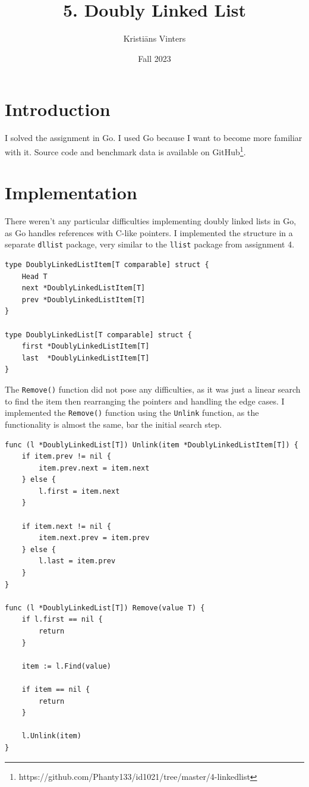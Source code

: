 \documentclass[a4paper,11pt]{article}
\title{\textbf{5. Doubly Linked List}}
\author{Kristiāns Vinters}
\date{Fall 2023}
\begin{document}
    \maketitle
    \section*{Introduction}

    I solved the assignment in Go. I used Go because I want to become more familiar with it. Source code and benchmark data is available on GitHub\footnote[1]{https://github.com/Phanty133/id1021/tree/master/4-linkedlist}.

    \section*{Implementation}

    There weren't any particular difficulties implementing doubly linked lists in Go, as Go handles references with C-like pointers. I implemented the structure in a separate \texttt{dllist} package, very similar to the \texttt{llist} package from assignment 4.

    \begin{verbatim}
type DoublyLinkedListItem[T comparable] struct {
    Head T
    next *DoublyLinkedListItem[T]
    prev *DoublyLinkedListItem[T]
}

type DoublyLinkedList[T comparable] struct {
    first *DoublyLinkedListItem[T]
    last  *DoublyLinkedListItem[T]
}
    \end{verbatim}

    The \texttt{Remove()} function did not pose any difficulties, as it was just a linear search to find the item then rearranging the pointers and handling the edge cases. I implemented the \texttt{Remove()} function using the \texttt{Unlink} function, as the functionality is almost the same, bar the initial search step.

    \begin{verbatim}
func (l *DoublyLinkedList[T]) Unlink(item *DoublyLinkedListItem[T]) {
    if item.prev != nil {
        item.prev.next = item.next
    } else {
        l.first = item.next
    }

    if item.next != nil {
        item.next.prev = item.prev
    } else {
        l.last = item.prev
    }
}

func (l *DoublyLinkedList[T]) Remove(value T) {
    if l.first == nil {
        return
    }

    item := l.Find(value)

    if item == nil {
        return
    }

    l.Unlink(item)
}
    \end{verbatim}
\end{document}
